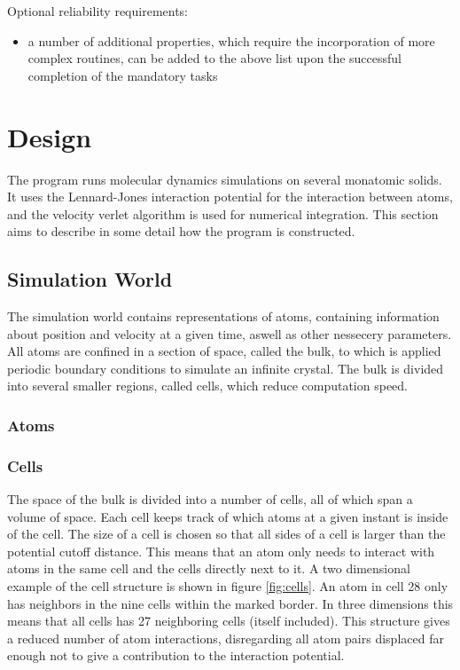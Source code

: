 \documentclass[12pt,a4paper]{article}
\begin{document}
Optional reliability requirements:
\begin{itemize}
\item a number of additional properties, which require the incorporation of more complex routines, can be added to the above list upon the successful completion of the mandatory tasks
\end{itemize}

\newpage
\section{Design}
The program runs molecular dynamics simulations on several monatomic solids. It uses the Lennard-Jones interaction potential for the interaction between atoms, and the velocity verlet algorithm is used for numerical integration. This section aims to describe in some detail how the program is constructed.

\subsection{Simulation World}
\label{sec:simulation_world}
The simulation world contains representations of atoms, containing information about position and velocity at a given time, aswell as other nessecery parameters.  All atoms are confined in a section of space, called the bulk, to which is applied periodic boundary conditions to simulate an infinite crystal. The bulk is divided into several smaller regions, called cells, which reduce computation speed. 

\subsubsection{Atoms}
\label{sec:atoms}

\subsubsection{Cells}
\label{sec:cells}
The space of the bulk is divided into a number of cells, all of which span a volume of space. Each cell keeps track of which atoms at a given instant is inside of the cell. The size of a cell is chosen so that all sides of a cell is larger than the potential cutoff distance. This means that an atom only needs to interact with atoms in the same cell and the cells directly next to it. A two dimensional example of the cell structure is shown in figure \ref{fig:cells}. An atom in cell 28 only has neighbors in the nine cells within the marked border. In three dimensions this means that all cells has 27 neighboring cells (itself included). This structure gives a reduced number of atom interactions, disregarding all atom pairs displaced far enough not to give a contribution to the interaction potential. 
\end{document}

